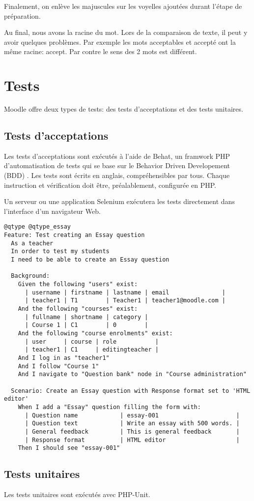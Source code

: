 Finalement, on enlève les majuscules sur les voyelles ajoutées durant l'étape de préparation.

Au final, nous avons la racine du mot.
Lors de la comparaison de texte, il peut y avoir quelques problèmes.
Par exemple les mots acceptables et accepté ont la même racine: accept.
Par contre le sens des 2 mots est différent.

\section{Tests}

Moodle offre deux types de tests: des tests d'acceptations et des tests unitaires.

\subsection{Tests d'acceptations}

Les tests d'acceptations sont exécutés à l'aide de Behat, un \og framwork \fg{} PHP d'automatisation de tests qui se base sur le \og Behavior Driven Developement (BDD) \fg{}.
Les tests sont écrits en anglais, compréhensibles par tous.
Chaque instruction et vérification doit être, préalablement, configurée en PHP.

Un serveur ou une application Selenium exécutera les tests directement dans l'interface d'un navigateur Web.

\begin{lstlisting}[frame=l]
@qtype @qtype_essay
Feature: Test creating an Essay question
  As a teacher
  In order to test my students
  I need to be able to create an Essay question

  Background:
    Given the following "users" exist:
      | username | firstname | lastname | email               |
      | teacher1 | T1        | Teacher1 | teacher1@moodle.com |
    And the following "courses" exist:
      | fullname | shortname | category |
      | Course 1 | C1        | 0        |
    And the following "course enrolments" exist:
      | user     | course | role           |
      | teacher1 | C1     | editingteacher |
    And I log in as "teacher1"
    And I follow "Course 1"
    And I navigate to "Question bank" node in "Course administration"

  Scenario: Create an Essay question with Response format set to 'HTML editor'
    When I add a "Essay" question filling the form with:
      | Question name            | essay-001                      |
      | Question text            | Write an essay with 500 words. |
      | General feedback         | This is general feedback       |
      | Response format          | HTML editor                    |
    Then I should see "essay-001"
\end{lstlisting}

\subsection{Tests unitaires}

Les tests unitaires sont exécutés avec PHP-Unit.

